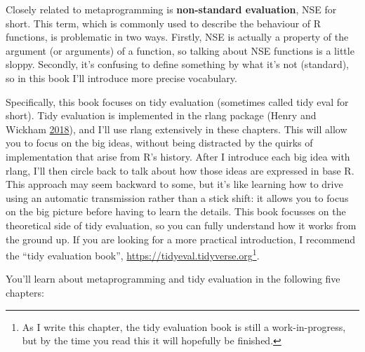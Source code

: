 \documentclass[]{book}
\let\rmarkdownfootnote\footnote%
\def\footnote{\protect\rmarkdownfootnote}
\begin{document}
Closely related to metaprogramming is \textbf{non-standard evaluation}, NSE for short. This term, which is commonly used to describe the behaviour of R functions, is problematic in two ways. Firstly, NSE is actually a property of the argument (or arguments) of a function, so talking about NSE functions is a little sloppy. Secondly, it's confusing to define something by what it's not (standard), so in this book I'll introduce more precise vocabulary.

Specifically, this book focuses on tidy evaluation (sometimes called tidy eval for short). Tidy evaluation is implemented in the rlang package (Henry and Wickham \protect\hyperlink{ref-rlang}{2018}), and I'll use rlang extensively in these chapters. This will allow you to focus on the big ideas, without being distracted by the quirks of implementation that arise from R's history. After I introduce each big idea with rlang, I'll then circle back to talk about how those ideas are expressed in base R. This approach may seem backward to some, but it's like learning how to drive using an automatic transmission rather than a stick shift: it allows you to focus on the big picture before having to learn the details. This book focusses on the theoretical side of tidy evaluation, so you can fully understand how it works from the ground up. If you are looking for a more practical introduction, I recommend the ``tidy evaluation book'', \url{https://tidyeval.tidyverse.org}\footnote{As I write this chapter, the tidy evaluation book is still a work-in-progress, but by the time you read this it will hopefully be finished.}.

You'll learn about metaprogramming and tidy evaluation in the following five chapters:
\end{document}
